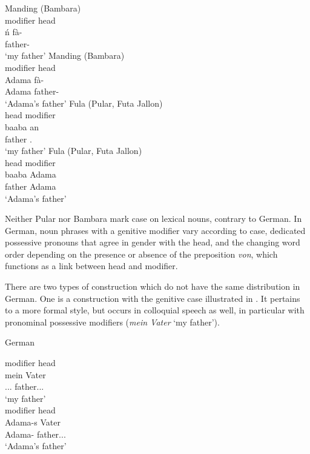 \documentclass[output=paper]{langscibook}
\begin{document}
    \begin{exe}
        \ex\label{fanego:ex:13} Manding (Bambara) \\
        \glll modifier head \\
        ń fà-\` \\
        \First\SG{} father-\ART{} \\
        \glt ‘my father’
        \ex\label{fanego:ex:14} Manding (Bambara) \\
        \glll modifier head \\
        Adama fà-\` \\
        Adama father-\ART{} \\
        \glt ‘Adama’s father’
        \ex\label{fanego:ex:15} Fula (Pular, Futa Jallon) \\
        \glll head modifier \\
        baaba an \\
        father \POSS.\Fsg{} \\
        \glt ‘my father’
        \ex\label{fanego:ex:16} Fula (Pular, Futa Jallon) \\
        \glll head modifier \\
        baaba Adama \\
        father Adama \\
        \glt ‘Adama’s father’
    \end{exe}

\noindent
Neither Pular nor Bambara mark case on lexical nouns, contrary to German. In German, noun phrases with a genitive modifier vary according to case, dedicated possessive pronouns that agree in gender with the head, and the changing word order depending on the presence or absence of the preposition \textit{von}, which functions as a link between head and modifier. 

There are two types of construction which do not have the same distribution in German. One is a construction with the genitive case illustrated in . It pertains to a more formal style, but occurs in colloquial speech as well, in particular with pronominal possessive modifiers (\textit{mein Vater} ‘my father’).

    \begin{exe}
        \ex\label{fanego:ex:17} German
        \begin{xlist}
            \ex\label{fanego:ex:17a} 
            \glll modifier head \\
            mein Vater \\
            \POSS.\First\SG.\M.\NOM{} father.\M.\SG.\NOM{} \\
            \glt ‘my father’ \\
            \ex\label{fanego:ex:17b} 
            \glll modifier head \\
            Adama-s Vater \\
            Adama-\GEN{} father.\M.\SG.\NOM{} \\
            \glt ‘Adama’s father’
        \end{xlist}
    \end{exe}
\end{document}
